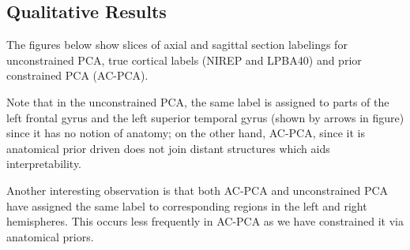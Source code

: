 \documentclass{llncs}
\begin{document}
{\subsection{Qualitative Results}

The figures below show slices of axial and sagittal section labelings for unconstrained PCA, true cortical labels (NIREP and LPBA40) and prior constrained PCA (AC-PCA).


Note that in the unconstrained PCA, the same label is assigned to parts of the left frontal gyrus and the left superior temporal gyrus (shown by arrows in figure) since it has no notion of anatomy; on the other hand, AC-PCA, since it is anatomical prior driven does not join distant structures which aids interpretability.

Another interesting observation is that both AC-PCA and unconstrained PCA have assigned  the same label to corresponding regions in the left and right hemispheres. This occurs less frequently in AC-PCA as we have constrained it via anatomical priors.  %


}
\end{document}
